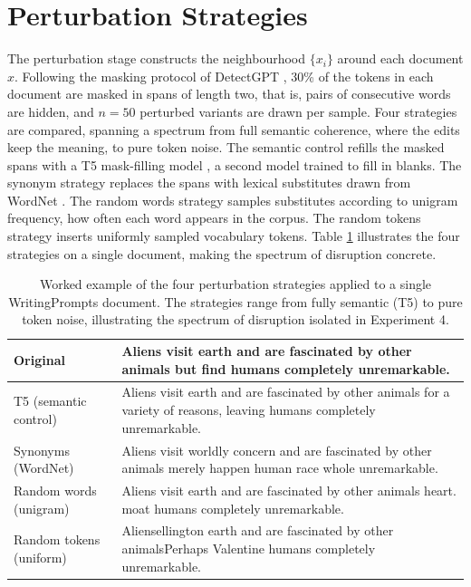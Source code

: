 \documentclass[logo,msc,cs]{infthesis}      %
\begin{document}
\section{Perturbation Strategies}
\label{sec:perturbations}
The perturbation stage constructs the neighbourhood $\{x_i\}$ around each document $x$. Following the masking protocol of DetectGPT \citep{mitchell2023detectgpt}, 30\% of the tokens in each document are masked in spans of length two, that is, pairs of consecutive words are hidden, and $n = 50$ perturbed variants are drawn per sample. Four strategies are compared, spanning a spectrum from full semantic coherence, where the edits keep the meaning, to pure token noise. The semantic control refills the masked spans with a T5 mask-filling model \citep{raffel2020exploring}, a second model trained to fill in blanks. The synonym strategy replaces the spans with lexical substitutes drawn from WordNet \citep{miller1995wordnet}. The random words strategy samples substitutes according to unigram frequency, how often each word appears in the corpus. The random tokens strategy inserts uniformly sampled vocabulary tokens. Table \ref{tab:perturbation_example} illustrates the four strategies on a single document, making the spectrum of disruption concrete.
\begin{table}[H]
\centering
\small
\caption{Worked example of the four perturbation strategies applied to a single WritingPrompts document. The strategies range from fully semantic (T5) to pure token noise, illustrating the spectrum of disruption isolated in Experiment 4.}
\label{tab:perturbation_example}
\begin{tabularx}{\textwidth}{@{} l X @{}}
\hline
Original & Aliens visit earth and are fascinated by other animals but find humans completely unremarkable. \\
\hline
T5 (semantic control) & Aliens visit earth and are fascinated by other animals for a variety of reasons, leaving humans completely unremarkable. \\
Synonyms (WordNet) & Aliens visit worldly concern and are fascinated by other animals merely happen human race whole unremarkable. \\
Random words (unigram) & Aliens visit earth and are fascinated by other animals heart. moat humans completely unremarkable. \\
Random tokens (uniform) & Aliensellington earth and are fascinated by other animalsPerhaps Valentine humans completely unremarkable. \\
\hline
\end{tabularx}
\end{table}
\end{document}
